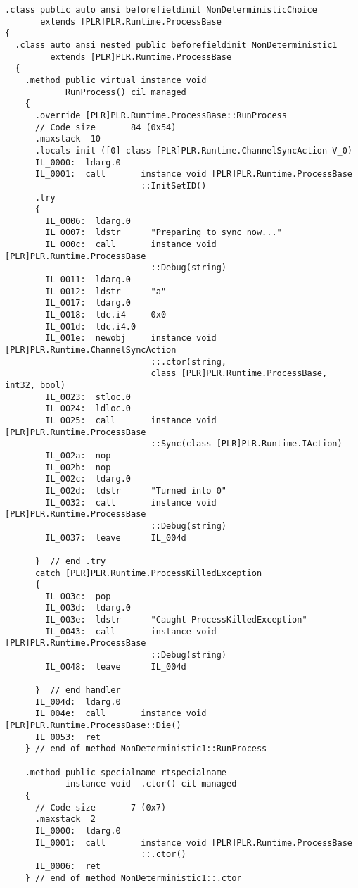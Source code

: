 \begin{lstlisting}
.class public auto ansi beforefieldinit NonDeterministicChoice
       extends [PLR]PLR.Runtime.ProcessBase
{
  .class auto ansi nested public beforefieldinit NonDeterministic1
         extends [PLR]PLR.Runtime.ProcessBase
  {
    .method public virtual instance void 
            RunProcess() cil managed
    {
      .override [PLR]PLR.Runtime.ProcessBase::RunProcess
      // Code size       84 (0x54)
      .maxstack  10
      .locals init ([0] class [PLR]PLR.Runtime.ChannelSyncAction V_0)
      IL_0000:  ldarg.0
      IL_0001:  call       instance void [PLR]PLR.Runtime.ProcessBase
                           ::InitSetID()
      .try
      {
        IL_0006:  ldarg.0
        IL_0007:  ldstr      "Preparing to sync now..."
        IL_000c:  call       instance void [PLR]PLR.Runtime.ProcessBase
                             ::Debug(string)
        IL_0011:  ldarg.0
        IL_0012:  ldstr      "a"
        IL_0017:  ldarg.0
        IL_0018:  ldc.i4     0x0
        IL_001d:  ldc.i4.0
        IL_001e:  newobj     instance void [PLR]PLR.Runtime.ChannelSyncAction
                             ::.ctor(string,
                             class [PLR]PLR.Runtime.ProcessBase, int32, bool)
        IL_0023:  stloc.0
        IL_0024:  ldloc.0
        IL_0025:  call       instance void [PLR]PLR.Runtime.ProcessBase
                             ::Sync(class [PLR]PLR.Runtime.IAction)
        IL_002a:  nop
        IL_002b:  nop
        IL_002c:  ldarg.0
        IL_002d:  ldstr      "Turned into 0"
        IL_0032:  call       instance void [PLR]PLR.Runtime.ProcessBase
                             ::Debug(string)
        IL_0037:  leave      IL_004d

      }  // end .try
      catch [PLR]PLR.Runtime.ProcessKilledException 
      {
        IL_003c:  pop
        IL_003d:  ldarg.0
        IL_003e:  ldstr      "Caught ProcessKilledException"
        IL_0043:  call       instance void [PLR]PLR.Runtime.ProcessBase
                             ::Debug(string)
        IL_0048:  leave      IL_004d

      }  // end handler
      IL_004d:  ldarg.0
      IL_004e:  call       instance void [PLR]PLR.Runtime.ProcessBase::Die()
      IL_0053:  ret
    } // end of method NonDeterministic1::RunProcess

    .method public specialname rtspecialname 
            instance void  .ctor() cil managed
    {
      // Code size       7 (0x7)
      .maxstack  2
      IL_0000:  ldarg.0
      IL_0001:  call       instance void [PLR]PLR.Runtime.ProcessBase
                           ::.ctor()
      IL_0006:  ret
    } // end of method NonDeterministic1::.ctor


\end{lstlisting}
